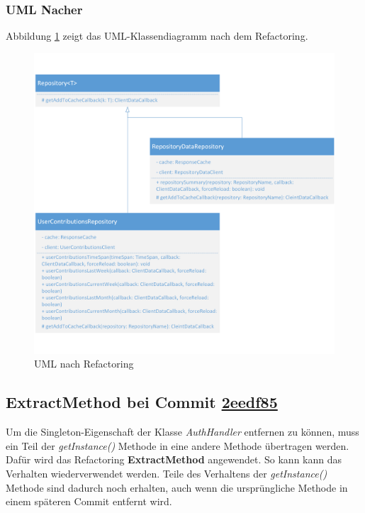 \documentclass[12pt]{article}
\begin{document}
\newpage
\subsubsection{UML Nacher}
Abbildung \ref{fig:ExtractMethod_Refactoring_After} zeigt das UML-Klassendiagramm nach dem Refactoring.
\begin{figure}[h]
  \includegraphics{refactoring_extract_method_repository_after.png}
  \caption{UML nach Refactoring}
  \label{fig:ExtractMethod_Refactoring_After}
\end{figure}
\newpage


\subsection{ExtractMethod bei Commit \href{https://github.com/lukaspanni/OpenSourceStats/commit/2eedf85be90e2566aa3811f9ccd3bac860c444a2} {2eedf85}}
\label{sec:ExtractMethod_AuthHandler}

Um die Singleton-Eigenschaft der Klasse \textit{AuthHandler} entfernen zu können, muss ein Teil der \textit{getInstance()} Methode in eine andere Methode übertragen werden.
Dafür wird das Refactoring \textbf{ExtractMethod} angewendet. So kann kann das Verhalten wiederverwendet werden. Teile des Verhaltens der \textit{getInstance()} Methode sind dadurch noch erhalten, auch wenn die ursprüngliche Methode in einem späteren Commit entfernt wird.
\end{document}
